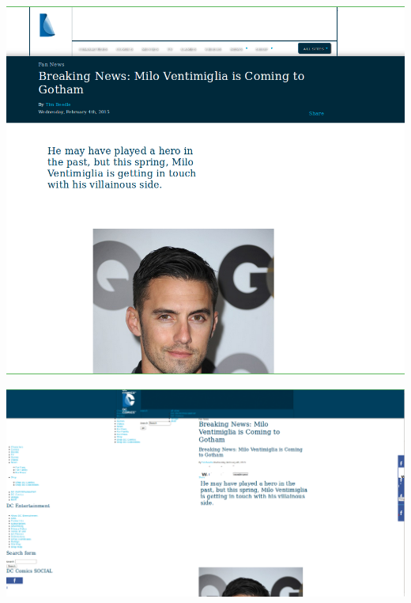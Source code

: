 \newpage
\begin{minipage}{\linewidth}
	\includegraphics[scale=0.55]{figures/playback/webrecorder_24_wail.PNG}
	\label{webrecorder_24_wail}
\end{minipage}
\newpage
\begin{minipage}{\linewidth}
	\includegraphics[scale=0.55]{figures/playback/webrecorder_24_warcreate.PNG}
	\label{webrecorder_24_warcreate}
\end{minipage}
\newpage
